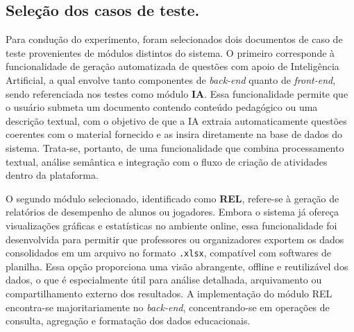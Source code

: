 \begin{enumerate}
\end{enumerate}



\subsection{Seleção dos casos de teste.}
Para condução do experimento, foram selecionados dois documentos de caso de teste provenientes de módulos distintos do sistema. O primeiro corresponde à funcionalidade de geração automatizada de questões com apoio de Inteligência Artificial, a qual envolve tanto componentes de \textit{back-end} quanto de \textit{front-end}, sendo referenciada nos testes como módulo \textbf{IA}. Essa funcionalidade permite que o usuário submeta um documento contendo conteúdo pedagógico ou uma descrição textual, com o objetivo de que a IA extraia automaticamente questões coerentes com o material fornecido e as insira diretamente na base de dados do sistema. Trata-se, portanto, de uma funcionalidade que combina processamento textual, análise semântica e integração com o fluxo de criação de atividades dentro da plataforma.

O segundo módulo selecionado, identificado como \textbf{REL}, refere-se à geração de relatórios de desempenho de alunos ou jogadores. Embora o sistema já ofereça visualizações gráficas e estatísticas no ambiente online, essa funcionalidade foi desenvolvida para permitir que professores ou organizadores exportem os dados consolidados em um arquivo no formato \texttt{.xlsx}, compatível com softwares de planilha. Essa opção proporciona uma visão abrangente, offline e reutilizável dos dados, o que é especialmente útil para análise detalhada, arquivamento ou compartilhamento externo dos resultados. A implementação do módulo REL encontra-se majoritariamente no \textit{back-end}, concentrando-se em operações de consulta, agregação e formatação dos dados educacionais.

